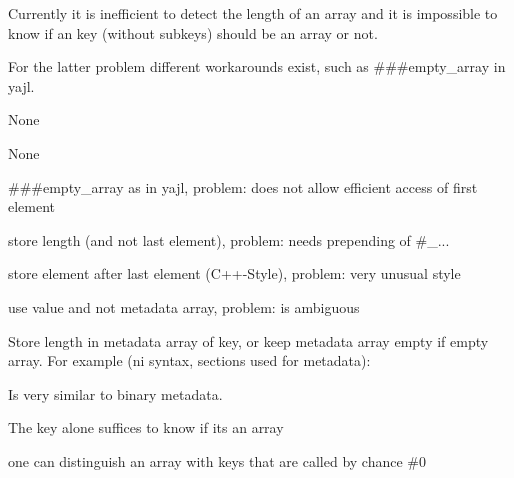 Currently it is inefficient to detect the length of an array and it is impossible to know if an key (without subkeys) should be an array or not.

For the latter problem different workarounds exist, such as {\ttfamily \#\#\#empty\+\_\+array} in {\ttfamily yajl}.


\begin{DoxyItemize}
\item None
\end{DoxyItemize}


\begin{DoxyItemize}
\item None
\end{DoxyItemize}


\begin{DoxyItemize}
\item {\ttfamily \#\#\#empty\+\_\+array} as in {\ttfamily yajl}, problem\+: does not allow efficient access of first element
\item store length (and not last element), problem\+: needs prepending of {\ttfamily \#\+\_\+...}
\item store element after last element (C++-\/\+Style), problem\+: very unusual style
\item use value and not metadata array, problem\+: is ambiguous
\end{DoxyItemize}

Store length in metadata {\ttfamily array} of key, or keep metadata {\ttfamily array} empty if empty array. For example ({\ttfamily ni syntax}, sections used for metadata)\+:


\begin{DoxyCode}{0}
\DoxyCodeLine{[myarray]}
\end{DoxyCode}



\begin{DoxyItemize}
\item Is very similar to {\ttfamily binary} metadata.
\item The key alone suffices to know if its an array
\item one can distinguish an array with keys that are called by chance \#0
\end{DoxyItemize}


